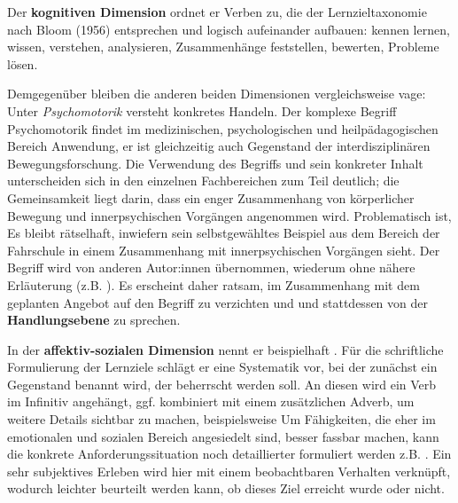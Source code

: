 \documentclass[
  twoside,
  parskip=half-,
]{scrreprt}
\begin{document}
Der \textbf{kognitiven Dimension} ordnet er Verben zu, die der Lernzieltaxonomie nach Bloom (1956) entsprechen  \autocites[vgl.][1008]{reich-claassen}[vgl. auch][22f.]{kos} und logisch aufeinander aufbauen: kennen lernen, wissen, verstehen, analysieren, Zusammenhänge feststellen, bewerten, Probleme lösen. 

Demgegenüber bleiben die anderen beiden Dimensionen vergleichsweise vage: Unter \textit{Psychomotorik} versteht \citeauthor{schlutz} konkretes Handeln. Der komplexe Begriff Psychomotorik findet im medizinischen, psychologischen und heilpädagogischen Bereich Anwendung, er ist gleichzeitig auch Gegenstand der interdisziplinären Bewegungsforschung. Die Verwendung des Begriffs und sein konkreter Inhalt unterscheiden sich in den einzelnen Fachbereichen zum Teil deutlich; die Gemeinsamkeit liegt darin, dass ein enger Zusammenhang von körperlicher Bewegung und innerpsychischen Vorgängen angenommen wird. Problematisch ist,  Es bleibt rätselhaft, inwiefern \citeauthor{schlutz} sein selbstgewähltes Beispiel aus dem Bereich der Fahrschule  in einem Zusammenhang mit innerpsychischen Vorgängen sieht. 
 Der Begriff wird von anderen Autor:innen übernommen, wiederum ohne nähere Erläuterung (z.B. \citeauthor{reich-claassen}). Es erscheint daher ratsam, im Zusammenhang mit dem geplanten Angebot auf den Begriff zu verzichten und und stattdessen von der \textbf{Handlungsebene} zu sprechen.
 
 In der \textbf{affektiv-sozialen Dimension} nennt er beispielhaft . Für die schriftliche Formulierung der Lernziele schlägt er eine Systematik vor, bei der zunächst ein Gegenstand benannt wird, der beherrscht werden soll. An diesen wird ein Verb im Infinitiv angehängt, ggf. kombiniert mit einem zusätzlichen Adverb, um weitere Details sichtbar zu machen, beispielsweise  Um Fähigkeiten, die eher im emotionalen und sozialen Bereich angesiedelt sind, besser fassbar machen, kann die konkrete Anforderungssituation noch detaillierter formuliert werden z.B. . Ein sehr subjektives Erleben wird hier mit einem beobachtbaren Verhalten verknüpft, wodurch leichter beurteilt werden kann, ob dieses Ziel erreicht wurde oder nicht.
\end{document}
